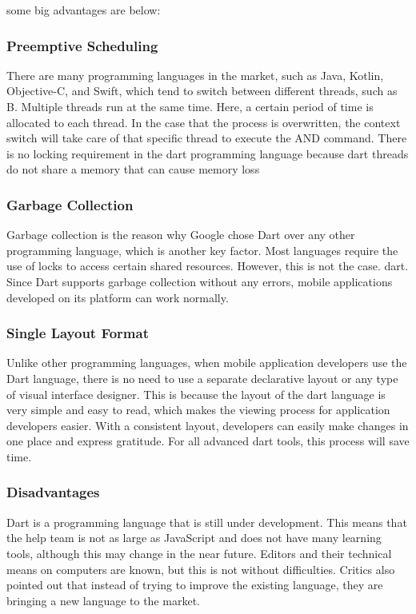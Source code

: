 some big advantages are below:
\subsubsection{Preemptive Scheduling}
There are many programming languages in the market, such as Java, Kotlin, Objective-C, and Swift, which tend to switch between different threads, such as B. Multiple threads run at the same time. Here, a certain period of time is allocated to each thread. In the case that the process is overwritten, the context switch will take care of that specific thread to execute the AND command. There is no locking requirement in the dart programming language because dart threads do not share a memory that can cause memory loss
\subsubsection{Garbage Collection}
Garbage collection is the reason why Google chose Dart over any other programming language, which is another key factor. Most languages require the use of locks to access certain shared resources. However, this is not the case. dart. Since Dart supports garbage collection without any errors, mobile applications developed on its platform can work normally.
\subsubsection{Single Layout Format}
Unlike other programming languages, when mobile application developers use the Dart language, there is no need to use a separate declarative layout or any type of visual interface designer. This is because the layout of the dart language is very simple and easy to read, which makes the viewing process for application developers easier. With a consistent layout, developers can easily make changes in one place and express gratitude. For all advanced dart tools, this process will save time.

\subsubsection{Disadvantages}
Dart is a programming language that is still under development. This means that the help team is not as large as JavaScript and does not have many learning tools, although this may change in the near future. Editors and their technical means on computers are known, but this is not without difficulties. Critics also pointed out that instead of trying to improve the existing language, they are bringing a new language to the market.

